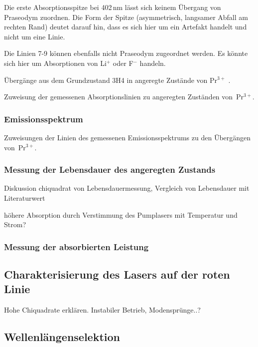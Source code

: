 Die erste Absorptionsspitze bei 402\,nm lässt sich keinem Übergang von Praseodym zuordnen.
Die Form der Spitze (asymmetrisch, langsamer Abfall am rechten Rand) deutet darauf hin,
dass es sich hier um ein Artefakt handelt und nicht um eine Linie.

Die Linien 7-9 können ebenfalls nicht Praseodym zugeordnet werden.
Es könnte sich hier um Absorptionen von Li$^+$ oder F$^-$ handeln.


\begin{table}[htb]
\caption{Übergänge aus dem Grundzustand 3H4 in angeregte Zustände von Pr$^{3+}$ \cite{NIST_ASD}.}

\label{tab:AbsSpecTh}
\end{table}

\begin{table}[htb]
\caption{Zuweisung der gemessenen Absorptionslinien zu angeregten Zuständen von~Pr$^{3+}$.}

\label{tab:AbsSpecVgl}
\end{table}

\FloatBarrier

\subsubsection{Emissionsspektrum}

\begin{table}[htb]
\caption{Zuweisungen der Linien des gemessenen Emissionsspektrums zu den Übergängen von~Pr$^{3+}$.}

\label{tab:EmSpecVgl}
\end{table}

\subsubsection{Messung der Lebensdauer des angeregten Zustands}

Diskussion chiquadrat von Lebensdauermessung, Vergleich von Lebensdauer mit Literaturwert

höhere Absorption durch Verstimmung des Pumplasers mit Temperatur und Strom?

\subsubsection{Messung der absorbierten Leistung}

\subsection{Charakterisierung des Lasers auf der roten Linie}
Hohe Chiquadrate erklären. Instabiler Betrieb, Modensprünge..?


\subsection{Wellenlängenselektion}